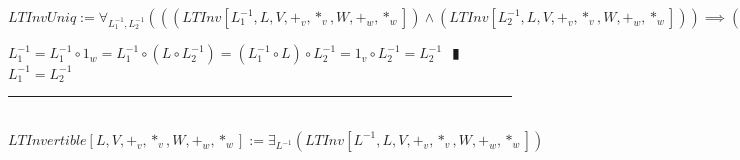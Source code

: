 \documentclass{book}
\newcommand{\abr}{:=}
\newcommand{\pipe}{$\phantom{(}\vrectangleblack\phantom{)}$}
\newcommand{\pr}[1]{\left(#1\right)}
\begin{document}
$LTInvUniq \abr \forall_{L_1^{-1}, L_2^{-1}}\pr{\pr{(LTInv[L_1^{-1}, L, V, +_v, *_v, W, +_w, *_w]) \land (LTInv[L_2^{-1}, L, V, +_v, *_v, W, +_w, *_w])} \implies (L_1^{-1} = L_2^{-1})}$
\begin{enumerate}
  \lit $L_1^{-1} = L_1^{-1} \circ 1_w = L_1^{-1} \circ (L \circ L_2^{-1}) = (L_1^{-1} \circ L) \circ L_2^{-1} = 1_v \circ L_2^{-1} = L_2^{-1}$ \pipe $L_1^{-1} = L_2^{-1}$
\end{enumerate} \vspace{.75mm} \hrule \vspace{.75mm} \ \\ 

$LTInvertible[L, V, +_v, *_v, W, +_w, *_w] \abr \exists_{L^{-1}}(LTInv[L^{-1}, L, V, +_v, *_v, W, +_w, *_w])$ \\
\end{document}
